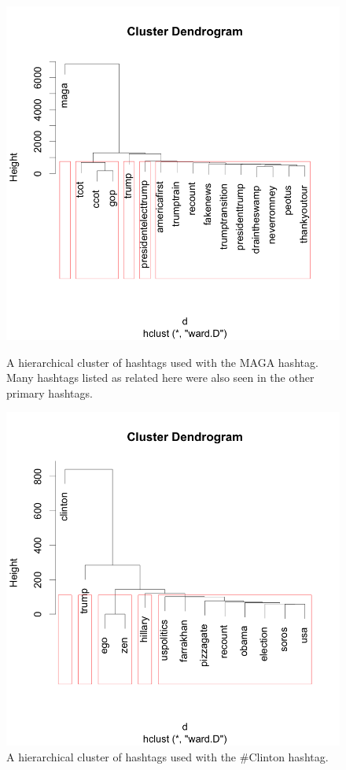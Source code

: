 \documentclass[prodmode]{acmsmall} %
\begin{document}
\begin{figure}
\centering
\begin{minipage}[b]{.49\textwidth}
    \includegraphics[width = \textwidth]{cluster-maga}
\caption{A hierarchical cluster of hashtags used with the MAGA hashtag. Many
  hashtags listed as related here were also seen in the other primary hashtags.}
\label{maga cluster}
\end{minipage}\hfill
\begin{minipage}[b]{.49\textwidth}
    \includegraphics[width = \textwidth]{cluster-clinton}
\caption{A hierarchical cluster of hashtags used with the \#Clinton hashtag.}
\label{clinton cluster}
\end{minipage}
\end{figure}
\end{document}

